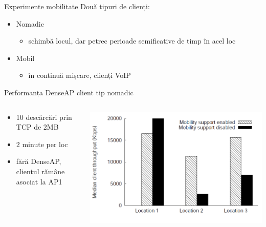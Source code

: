 \begin{frame}{Experimente mobilitate}
  Două tipuri de clienți:
  \begin{itemize}
    \item Nomadic
    \begin{itemize}
      \item schimbă locul, dar petrec perioade semificative de timp în acel loc
    \end{itemize}
    \item Mobil
    \begin{itemize}
      \item în continuă mișcare, clienți VoIP
    \end{itemize}
  \end{itemize}
\end{frame}

\begin{frame}{Performanța DenseAP client tip nomadic}
  \begin{columns}
  \begin{column}{0.4\linewidth}
    \begin{itemize}
      \item 10 descărcări prin TCP de 2MB
      \item 2 minute per loc
      \item fără DenseAP, clientul rămâne asociat la AP1
    \end{itemize}
  \end{column}
  \begin{column}{0.6\linewidth}
    \includegraphics[scale=0.27]{img/fig21.png}
  \end{column}
  \end{columns}
\end{frame}
